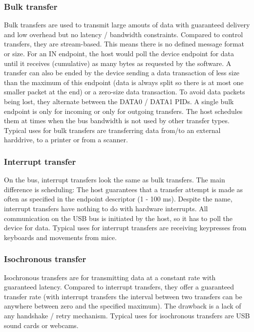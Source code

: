 \documentclass{article}
\begin{document}
\subsubsection {Bulk transfer}

Bulk transfers are used to transmit large amouts of data with guaranteed delivery
and low overhead but no latency / bandwidth constraints.
Compared to control transfers, they are stream-based. This means there is no defined message
format or size. For an IN endpoint, the host would poll the device endpoint for data until it receives
(cumulative) as many bytes as requested by the software. A transfer can also be ended by the device sending
a data transaction of less size than the maximum of this endpoint (data is always split so there is at most one
smaller packet at the end) or a zero-size data transaction. To avoid data packets being lost, they
alternate between the DATA0 / DATA1 PIDs. A single bulk endpoint is only for incoming
or only for outgoing transfers.
The host schedules them at times when the bus bandwidth is not used by other transfer types.
Typical uses for bulk transfers are transferring data from/to an external harddrive,
to a printer or from a scanner. \cite[p. 52ff.]{usbstd}

\subsubsection {Interrupt transfer}

On the bus, interrupt transfers look the same as bulk transfers.
The main difference is scheduling: The host guarantees that a transfer
attempt is made as often as specified in the endpoint descriptor (1 - 100 ms).
Despite the name, interrupt transfers have nothing to do with hardware interrupts.
All communication on the USB bus is initiated by the host, so it has to poll the device
for data.
Typical uses for interrupt transfers are receiving keypresses from keyboards and
movements from mice. \cite[p. 48ff.]{usbstd}

\subsubsection {Isochronous transfer}

Isochronous transfers are for transmitting data at a constant rate with guaranteed
latency. Compared to interrupt transfers, they offer a guaranteed transfer rate
(with interrupt transfers the interval between two transfers can be anywhere
between zero and the specified maximum). The drawback is a lack of any handshake
/ retry mechanism.
Typical uses for isochronous transfers are USB sound cards or webcams.
\cite[p. 44ff.]{usbstd}
\end{document}
